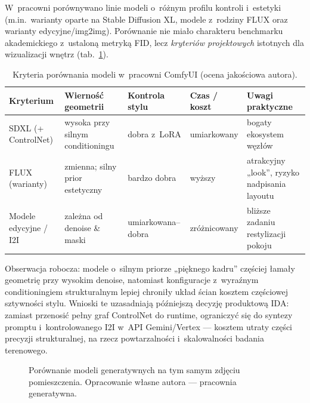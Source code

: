 W~pracowni porównywano linie modeli o~różnym profilu kontroli i~estetyki (m.in.\ warianty oparte na Stable Diffusion XL, modele z~rodziny FLUX oraz warianty edycyjne/img2img). Porównanie nie miało charakteru benchmarku akademickiego z~ustaloną metryką FID, lecz \emph{kryteriów projektowych} istotnych dla wizualizacji wnętrz (tab.~\ref{tab:ch04:modele}).

\begin{table}[htbp]
  \centering
  \caption{Kryteria porównania modeli w~pracowni ComfyUI (ocena jakościowa autora).}
  \label{tab:ch04:modele}
  \begin{tabular}{@{}p{2.4cm}p{2.6cm}p{2.6cm}p{2.4cm}p{2.6cm}@{}}
    \toprule
    Kryterium & Wierność geometrii & Kontrola stylu & Czas / koszt & Uwagi praktyczne \\
    \midrule
    SDXL (+ ControlNet) & wysoka przy silnym conditioningu & dobra z~LoRA & umiarkowany & bogaty ekosystem węzłów \\
    FLUX (warianty) & zmienna; silny prior estetyczny & bardzo dobra & wyższy & atrakcyjny „look”, ryzyko nadpisania layoutu \\
    Modele edycyjne / I2I & zależna od denoise \& maski & umiarkowana--dobra & zróżnicowany & bliższe zadaniu restylizacji pokoju \\
    \bottomrule
  \end{tabular}
\end{table}

Obserwacja robocza: modele o~silnym priorze „pięknego kadru” częściej łamały geometrię przy wysokim denoise, natomiast konfiguracje z~wyraźnym conditioningiem strukturalnym lepiej chroniły układ ścian kosztem częściowej sztywności stylu. Wnioski te uzasadniają późniejszą decyzję produktową IDA: zamiast przenosić pełny graf ControlNet do runtime, ograniczyć się do syntezy promptu i~kontrolowanego I2I w~API Gemini/Vertex --- kosztem utraty części precyzji strukturalnej, na rzecz powtarzalności i~skalowalności badania terenowego.

\begin{figure}[htbp]
  \centering
  \caption{Porównanie modeli generatywnych na tym samym zdjęciu pomieszczenia.
  Opracowanie własne autora --- pracownia generatywna.}
  \label{fig:ch04:model-comparison}
\end{figure}

